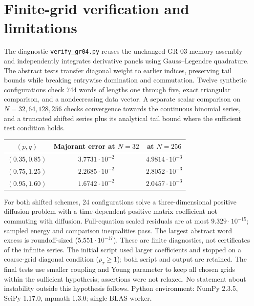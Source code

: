 \documentclass[11pt,a4paper]{article}
\begin{document}
\section{Finite-grid verification and limitations}
The diagnostic \texttt{verify\_gr04.py} reuses the unchanged GR-03 memory assembly and independently integrates derivative panels using Gauss--Legendre quadrature. The abstract tests transfer diagonal weight to earlier indices, preserving tail bounds while breaking entrywise domination and commutation. Twelve synthetic configurations check 744 words of lengths one through five, exact triangular comparison, and a nondecreasing data vector. A separate scalar comparison on $N=32,64,128,256$ checks convergence towards the continuous binomial series, and a truncated shifted series plus its analytical tail bound where the sufficient test condition holds.
\begin{center}\small
\begin{tabular}{ccc}
\toprule
$(p,q)$ & Majorant error at $N=32$ & at $N=256$\\\midrule
$(0.35,0.85)$ & $3.7731\cdot10^{-2}$ & $4.9814\cdot10^{-3}$\\
$(0.75,1.25)$ & $2.2685\cdot10^{-2}$ & $2.8052\cdot10^{-3}$\\
$(0.95,1.60)$ & $1.6742\cdot10^{-2}$ & $2.0457\cdot10^{-3}$\\\bottomrule
\end{tabular}
\end{center}
For both shifted schemes, 24 configurations solve a three-dimensional positive diffusion problem with a time-dependent positive matrix coefficient not commuting with diffusion. Full-equation scaled residuals are at most $9.329\cdot10^{-15}$; sampled energy and comparison inequalities pass. The largest abstract word excess is roundoff-sized ($5.551\cdot10^{-17}$). These are finite diagnostics, not certificates of the infinite series. The initial script used larger coefficients and stopped on a coarse-grid diagonal condition ($\rho_\tau\ge1$); both script and output are retained. The final tests use smaller coupling and Young parameter to keep all chosen grids within the sufficient hypothesis; assertions were not relaxed. No statement about instability outside this hypothesis follows. Python environment: NumPy 2.3.5, SciPy 1.17.0, mpmath 1.3.0; single BLAS worker.
\end{document}
